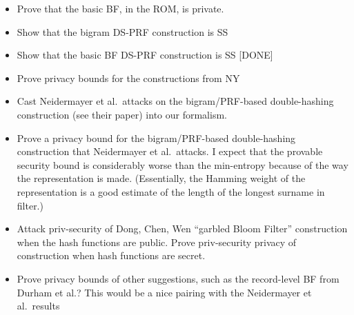 \begin{itemize}
\item Prove that the basic BF, in the ROM, is private.  
\item Show that the bigram DS-PRF construction is SS 
\item Show that the basic BF DS-PRF construction is SS [DONE]
\item Prove privacy bounds for the constructions from NY 

\item Cast Neidermayer et al.\ attacks on the bigram/PRF-based double-hashing construction (see their paper) into our formalism.  

\item Prove a privacy bound for the bigram/PRF-based double-hashing construction that Neidermayer et al.\ attacks. I expect that the provable security bound is considerably worse than the min-entropy because of the way the representation is made.  (Essentially, the Hamming weight of the representation is a good estimate of the length of the longest surname in filter.)

\item Attack priv-security of Dong, Chen, Wen ``garbled Bloom Filter'' construction when the hash functions are public.  Prove priv-security privacy of construction when hash functions are secret.  

\item Prove privacy bounds of other suggestions, such as the record-level BF from Durham et al.?  This would be a nice pairing with the Neidermayer et al.\ results 

\end{itemize}
